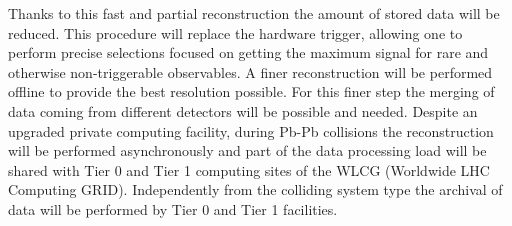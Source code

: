 Thanks to this fast and partial reconstruction the amount of stored data will be reduced.
This procedure will replace the hardware trigger, allowing one to perform precise selections focused on getting the maximum signal for rare and otherwise non-triggerable observables.
A finer reconstruction will be performed offline to provide the best resolution possible.
For this finer step the merging of data coming from different detectors will be possible and needed.
Despite an upgraded private computing facility, during Pb-Pb collisions the reconstruction will be performed asynchronously and part of the data processing load will be shared with Tier 0 and Tier 1 computing sites of the WLCG (Worldwide LHC Computing GRID).
Independently from the colliding system type the archival of data will be performed by Tier 0 and Tier 1 facilities.

